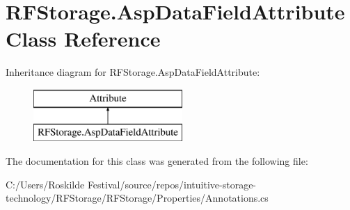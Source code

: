 \section{R\+F\+Storage.\+Asp\+Data\+Field\+Attribute Class Reference}
\label{class_r_f_storage_1_1_asp_data_field_attribute}
Inheritance diagram for R\+F\+Storage.\+Asp\+Data\+Field\+Attribute\+:\begin{figure}[H]
\begin{center}
\leavevmode
\includegraphics[height=2.000000cm]{class_r_f_storage_1_1_asp_data_field_attribute}
\end{center}
\end{figure}


The documentation for this class was generated from the following file\+:\begin{DoxyCompactItemize}
\item 
C\+:/\+Users/\+Roskilde Festival/source/repos/intuitive-\/storage-\/technology/\+R\+F\+Storage/\+R\+F\+Storage/\+Properties/Annotations.\+cs\end{DoxyCompactItemize}

